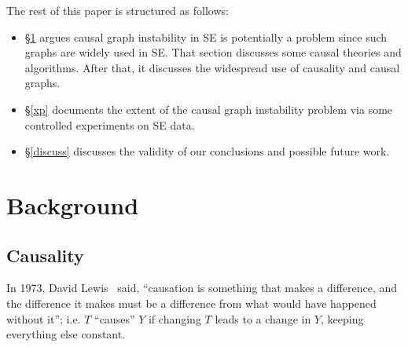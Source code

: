 \documentclass[]{svjour3}
\begin{document}

 The rest of this paper is structured as follows:
 \begin{itemize}
 \item \S\ref{back} argues causal graph instability in SE is potentially a problem since
such graphs are widely used in SE.   
That section discusses some causal theories and algorithms. After that,
it discusses the widespread use of causality
and causal graphs.
\item  \S\ref{xp}  documents the extent of the causal graph instability problem via some controlled experiments on SE data.
\item {\S}\ref{discuss} discusses the validity of our conclusions and possible future work.
\end{itemize}




  
\section{Background } \label{back}







\subsection{Causality}

In 1973, David Lewis~\cite{Lewis1973} said, ``causation is something that makes a difference, and the difference it makes must be a difference from what would have happened without it''; i.e.
$T$ ``causes'' $Y$ if changing $T$ leads to a change in $Y$, keeping everything else constant. 
\end{document}
